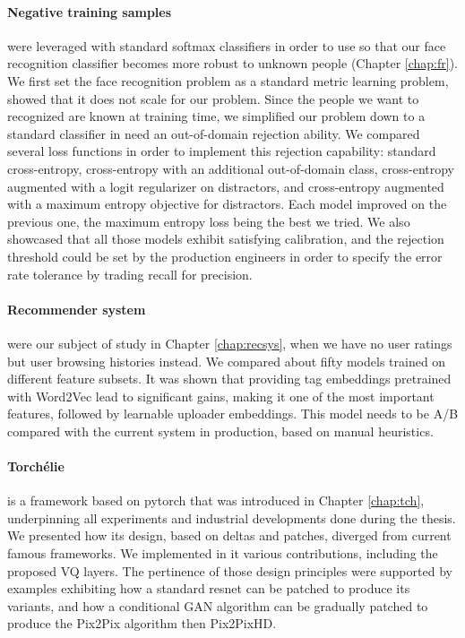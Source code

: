 \paragraph{Negative training samples} were leveraged with standard softmax  classifiers in order to use  so that our face recognition classifier becomes more robust to unknown people (Chapter \ref{chap:fr}). We first set the face recognition problem as a standard metric learning problem, showed that it does not scale for our problem. Since the people we want to recognized are known at training time, we simplified our problem down to a standard classifier in need an out-of-domain rejection ability. We compared several loss functions in order to implement this rejection capability: standard cross-entropy, cross-entropy with an additional out-of-domain class, cross-entropy augmented with a logit regularizer on distractors, and cross-entropy augmented with a maximum entropy objective for distractors. Each model improved on the previous one, the maximum entropy loss being the best we tried. We also showcased that all those models exhibit satisfying calibration, and the rejection threshold could be set by the production engineers in order to specify the error rate tolerance by trading recall for precision.

\paragraph{Recommender system} were our subject of study in Chapter \ref{chap:recsys}, when we have no user ratings but user browsing histories instead. We compared about fifty models trained on different feature subsets. It was shown that providing tag embeddings pretrained with Word2Vec lead to significant gains, making it one of the most important features, followed by learnable uploader embeddings. This model needs to be A/B compared with the current system in production, based on manual heuristics.

\paragraph{Torchélie} is a framework based on pytorch that was introduced in Chapter \ref{chap:tch}, underpinning all experiments and industrial developments done during the thesis. We presented how its design, based on deltas and patches, diverged from current famous frameworks. We implemented in it various contributions, including the proposed \ac{VQ} layers. The pertinence of those design principles were supported by examples exhibiting how a standard resnet can be patched to produce its variants, and how a conditional GAN algorithm can be gradually patched to produce the Pix2Pix algorithm then Pix2PixHD.

